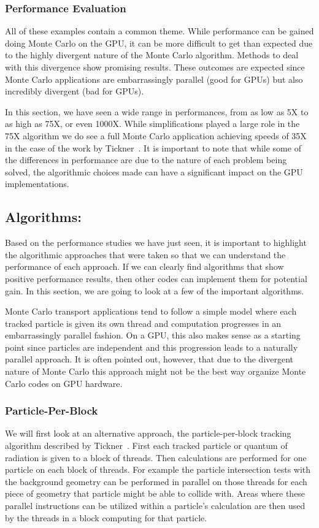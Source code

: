 \subsubsection*{\textbf{Performance Evaluation}}
All of these examples contain a common theme.
%
While performance can be gained doing Monte Carlo on the GPU, it can be more difficult to get than expected due to the highly divergent nature of the Monte Carlo algorithm.
%
Methods to deal with this divergence show promising results.
%
These outcomes are expected since Monte Carlo applications are embarrassingly parallel (good for GPUs) but also incredibly divergent (bad for GPUs).
%

In this section, we have seen a wide range in performances, from as low as 5X to as high as 75X, or even 1000X.
%
While simplifications played a large role in the 75X algorithm we do see a full Monte Carlo application achieving speeds of 35X in the case of the work by Tickner~\cite{tickner2010monte}.
%
It is important to note that while some of the differences in performance are due to the nature of each problem being solved, the algorithmic choices made can have a significant impact on the GPU implementations.
%

\subsection*{\textbf{Algorithms:}}

Based on the performance studies we have just seen, it is important to highlight the algorithmic approaches that were taken so that we can understand the performance of each approach.
%
If we can clearly find algorithms that show positive performance results, then other codes can implement them for potential gain.
%
In this section, we are going to look at a few of the important algorithms.
%

%
Monte Carlo transport applications tend to follow a simple model where each tracked particle is given its own thread and computation progresses in an embarrassingly parallel fashion. 
%
On a GPU, this also makes sense as a starting point since particles are independent and this progression leads to a naturally parallel approach.
%
It is often pointed out, however, that due to the divergent nature of Monte Carlo this approach might not be the best way organize Monte Carlo codes on GPU hardware.
%

\subsubsection*{\textbf{Particle-Per-Block}}
We will first look at an alternative approach, the particle-per-block tracking algorithm described by Tickner~\cite{tickner2010monte}.
%
First each tracked particle or quantum of radiation is given to a block of threads.
%
Then calculations are performed for one particle on each block of threads.
%
For example the particle intersection tests with the background geometry can be performed in parallel on those threads for each piece of geometry that particle might be able to collide with.
%
Areas where these parallel instructions can be utilized within a particle's calculation are then used by the threads in a block computing for that particle.
%

